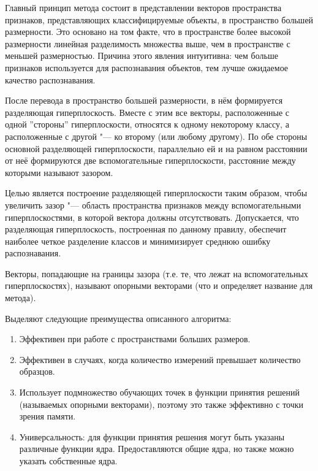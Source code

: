 \documentclass[bachelor, och, coursework]{SCWorks}
\begin{document}
            Главный принцип метода состоит в представлении векторов пространства
            признаков, представляющих классифицируемые объекты, в пространство
            большей размерности. Это основано на том факте, что в пространстве
            более высокой размерности линейная разделимость множества выше, чем
            в пространстве с меньшей размерностью. Причина этого явления
            интуитивна: чем больше признаков используется для распознавания
            объектов, тем лучше ожидаемое качество распознавания.


            После перевода в пространство большей размерности, в нём формируется
            разделяющая гиперплоскость. Вместе с этим все векторы, расположенные
            с одной ''стороны'' гиперплоскости, относятся к одному некоторому
            классу, а расположенные с другой "--- ко второму (или любому
            другому). По обе стороны основной разделяющей гиперплоскости,
            параллельно ей и на равном расстоянии от неё формируются две
            вспомогательные гиперплоскости, расстояние между которыми называют
            зазором.

            Целью является построение разделяющей гиперплоскости таким образом,
            чтобы увеличить зазор "--- область пространства признаков между
            вспомогательными гиперплоскостями, в которой вектора должны
            отсутствовать. Допускается, что разделяющая гиперплоскость,
            построенная по данному правилу, обеспечит наиболее четкое разделение
            классов и минимизирует среднюю ошибку распознавания.

            Векторы, попадающие на границы зазора (т.е. те, что лежат на
            вспомогательных гиперплоскостях), называют опорными векторами (что и
            определяет название для метода). \cite{svm}

            Выделяют следующие преимущества описанного алгоритма:

            \begin{enumerate}
                \item Эффективен при работе с пространствами больших размеров.
                \item Эффективен в случаях, когда количество измерений превышает
                количество образцов.
                \item Использует подмножество обучающих точек в функции принятия
                решений (называемых опорными векторами), поэтому это также
                эффективно с точки зрения памяти.
                \item Универсальность: для функции принятия решения могут быть
                указаны различные функции ядра. Предоставляются общие ядра, но
                также можно указать собственные ядра.
            \end{enumerate}
            
\end{document}
